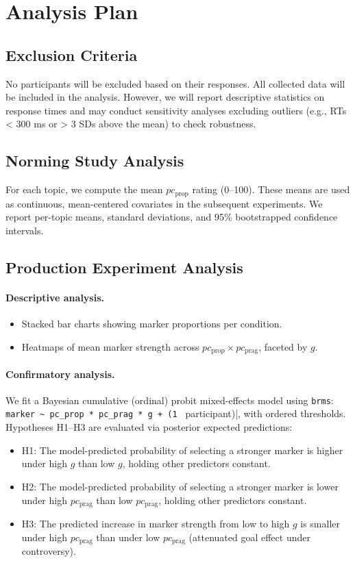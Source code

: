 \documentclass[12pt]{article}
\begin{document}
\section{Analysis Plan}

\subsection{Exclusion Criteria}

No participants will be excluded based on their responses. All collected data will be included in the analysis. However, we will report descriptive statistics on response times and may conduct sensitivity analyses excluding outliers (e.g., RTs < 300 ms or > 3 SDs above the mean) to check robustness.

\subsection{Norming Study Analysis}
For each topic, we compute the mean $pc_{\text{prop}}$ rating (0--100). These means are used as continuous, mean-centered covariates in the subsequent experiments. We report per-topic means, standard deviations, and 95\% bootstrapped confidence intervals.

\subsection{Production Experiment Analysis}

\paragraph{Descriptive analysis.}
\begin{itemize}
    \item Stacked bar charts showing marker proportions per condition.
    \item Heatmaps of mean marker strength across $pc_{\text{prop}} \times pc_{\text{prag}}$, faceted by $g$.
\end{itemize}

\paragraph{Confirmatory analysis.}
We fit a Bayesian cumulative (ordinal) probit mixed-effects model using \texttt{brms}: \verb|marker ~ pc_prop * pc_prag * g + (1 | participant)|, with ordered thresholds. Hypotheses H1--H3 are evaluated via posterior expected predictions:
\begin{itemize}
    \item H1: The model-predicted probability of selecting a stronger marker is higher under high $g$ than low $g$, holding other predictors constant.
    \item H2: The model-predicted probability of selecting a stronger marker is lower under high $pc_{\text{prag}}$ than low $pc_{\text{prag}}$, holding other predictors constant.
    \item H3: The predicted increase in marker strength from low to high $g$ is smaller under high $pc_{\text{prag}}$ than under low $pc_{\text{prag}}$ (attenuated goal effect under controversy).
\end{itemize}
\end{document}
